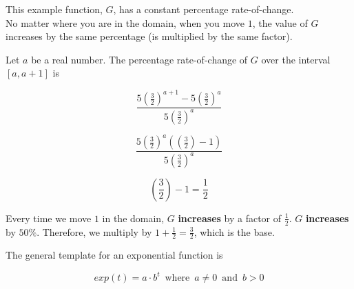 \documentclass{ximera}
\begin{document}
This example function, $G$, has a constant percentage rate-of-change. \\

No matter where you are in the domain, when you move $1$, the value of $G$ increases by the same percentage (is multiplied by the same factor).


Let $a$ be a real number.  The percentage rate-of-change of $G$ over the interval $[a,a+1]$ is 



\[    \frac{5 \left(\frac{3}{2}\right)^{a+1} - 5 \left(\frac{3}{2}\right)^a}{5 \left(\frac{3}{2}\right)^a}       \]


\[   \frac{5 \left(\frac{3}{2}\right)^a (\left(\frac{3}{2}\right) - 1) }{5 \left(\frac{3}{2}\right)^a}    \]


\[   \left(\frac{3}{2}\right) - 1 = \frac{1}{2}   \]

Every time we move $1$ in the domain, $G$ \textbf{\textcolor{blue!55!black}{increases}} by a factor of $\frac{1}{2}$.  $G$ \textbf{\textcolor{blue!55!black}{increases}} by $50\%$.  Therefore, we multiply by $1 + \frac{1}{2} = \frac{3}{2}$, which is the base.





The general template for an exponential function is 

\[   exp(t) = a \cdot b^t   \, \text{ where } \,  a \ne 0  \, \text{ and } \,    b > 0   \]
\end{document}
